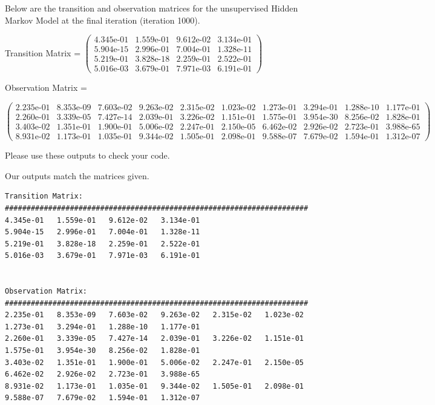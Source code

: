 Below are the transition and observation matrices for the unsupervised Hidden Markov Model at the final iteration (iteration 1000).

Transition Matrix = \small $\begin{pmatrix}
    4.345\text{e-}01 & 1.559\text{e-}01 & 9.612\text{e-}02 & 3.134\text{e-}01\\
    5.904\text{e-}15 & 2.996\text{e-}01 & 7.004\text{e-}01 & 1.328\text{e-}11\\
    5.219\text{e-}01 & 3.828\text{e-}18 & 2.259\text{e-}01 & 2.522\text{e-}01\\
    5.016\text{e-}03 & 3.679\text{e-}01 & 7.971\text{e-}03 & 6.191\text{e-}01 
\end{pmatrix}$ 
\normalsize

Observation Matrix =

\small
$\begin{pmatrix}
    2.235\text{e-}01 & 8.353\text{e-}09 & 7.603\text{e-}02 & 9.263\text{e-}02 & 2.315\text{e-}02 & 1.023\text{e-}02 & 1.273\text{e-}01 & 3.294\text{e-}01 & 1.288\text{e-}10 & 1.177\text{e-}01\\ 
    2.260\text{e-}01 & 3.339\text{e-}05 & 7.427\text{e-}14 & 2.039\text{e-}01 & 3.226\text{e-}02 & 1.151\text{e-}01 & 1.575\text{e-}01 & 3.954\text{e-}30 & 8.256\text{e-}02 & 1.828\text{e-}01\\  
    3.403\text{e-}02 & 1.351\text{e-}01 & 1.900\text{e-}01 & 5.006\text{e-}02 & 2.247\text{e-}01 & 2.150\text{e-}05 & 6.462\text{e-}02 & 2.926\text{e-}02 & 2.723\text{e-}01 & 3.988\text{e-}65\\   
    8.931\text{e-}02 & 1.173\text{e-}01 & 1.035\text{e-}01 & 9.344\text{e-}02 & 1.505\text{e-}01 & 2.098\text{e-}01 & 9.588\text{e-}07 & 7.679\text{e-}02 & 1.594\text{e-}01 & 1.312\text{e-}07   
\end{pmatrix}$
\normalsize
\medskip

Please use these outputs to check your code.

\begin{solution}
  Our outputs match the matrices given.
  \begin{verbatim}
Transition Matrix:
######################################################################
4.345e-01   1.559e-01   9.612e-02   3.134e-01   
5.904e-15   2.996e-01   7.004e-01   1.328e-11   
5.219e-01   3.828e-18   2.259e-01   2.522e-01   
5.016e-03   3.679e-01   7.971e-03   6.191e-01   


Observation Matrix:  
######################################################################
2.235e-01   8.353e-09   7.603e-02   9.263e-02   2.315e-02   1.023e-02   1.273e-01   3.294e-01   1.288e-10   1.177e-01   
2.260e-01   3.339e-05   7.427e-14   2.039e-01   3.226e-02   1.151e-01   1.575e-01   3.954e-30   8.256e-02   1.828e-01   
3.403e-02   1.351e-01   1.900e-01   5.006e-02   2.247e-01   2.150e-05   6.462e-02   2.926e-02   2.723e-01   3.988e-65   
8.931e-02   1.173e-01   1.035e-01   9.344e-02   1.505e-01   2.098e-01   9.588e-07   7.679e-02   1.594e-01   1.312e-07
  \end{verbatim}
\end{solution}

